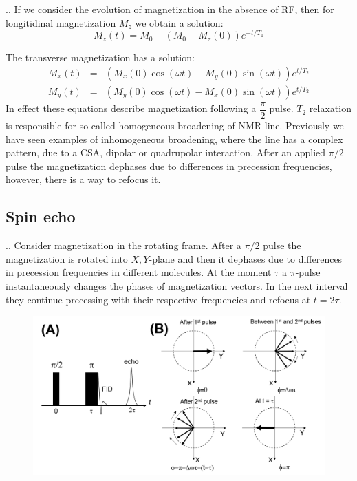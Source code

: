 \documentclass{beamer}
\begin{document}
\begin{frame}{\thesection.\thesubsection. \insertsubsection}
	If we consider the evolution of magnetization in the absence of RF, then for longitidinal magnetization $M_z$ we obtain a solution:
	\begin{equation}
		M_z(t) = M_0 - (M_0 - M_z(0)  ) e^{-t/T_1}		
	\end{equation}
	
	
	The transverse magnetization has a solution:
	\begin{equation}
	\begin{array}{lcl}
       M_x(t)&=& (M_x(0) \cos( \omega t)  + M_y(0) \sin( \omega t)) e^{t/T_2} \\     
       M_y(t)&=& (M_y(0) \cos( \omega t)  - M_x(0) \sin( \omega t)) e^{t/T_2} 
	\end{array}
	\end{equation}
	In effect these equations describe magnetization following a $\dfrac{\pi}{2}$ pulse. 
    $T_2$ relaxation is responsible for so called \alert{homogeneous} broadening of NMR line. Previously we have seen examples of \alert{inhomogeneous} broadening, where the line has a complex pattern, due to a CSA, dipolar or quadrupolar interaction. After an applied $\pi/2$ pulse the magnetization dephases due to differences in precession frequencies, however, there is a way to refocus it. 
\end{frame}

\subsection{Spin echo}
\begin{frame}{\thesection.\thesubsection. \insertsubsection}
  Consider magnetization in the rotating frame.  After a $\pi/2$ pulse the magnetization is rotated into $X,Y$-plane and then it dephases due to differences in precession frequencies in different molecules. At the moment $\tau$ a $\pi$-pulse instantaneously changes the phases of magnetization vectors. In the next interval they continue precessing with their respective frequencies and refocus at $t = 2 \tau$. 
  \begin{figure}
  	\centering
  	\includegraphics[scale =0.3]{spin_echo.png}
  \end{figure}
\end{frame}
\end{document}
